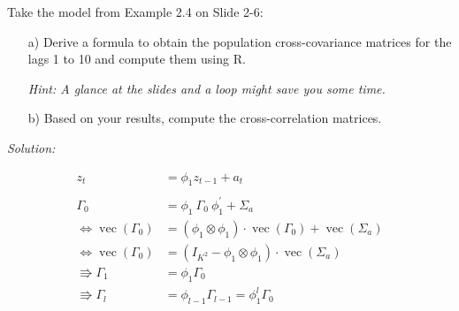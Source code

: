 \documentclass[12pt,a4paper]{article}
\renewcommand{\vec}{\operatorname{vec}}
\begin{document}
Take the model from Example 2.4 on Slide 2-6:

\begin{itemize}
  \item[a)] Derive a formula to obtain the population cross-covariance matrices for the lags 1 to 10 and compute them using R.
  \item[] \textit{Hint: A glance at the slides and a loop might save you some time.}
  \item[b)] Based on your results, compute the cross-correlation matrices.
\end{itemize}

\emph{Solution:}

\begin{align*}
  z_t & = \phi_1 z_{t-1} + a_t\\
  \\
  \Gamma_0 & = \phi_1  \ \Gamma_0 \ \phi_1^{'} + \Sigma_a\\
  \Leftrightarrow \vec(\Gamma_0) &= (\phi_1 \otimes \phi_1) \cdot \vec(\Gamma_0) + \vec(\Sigma_a) \\
  \Leftrightarrow \vec(\Gamma_0) &= (I_{K^2} - \phi_1 \otimes \phi_1) \cdot \vec(\Sigma_a) \\
 \Rrightarrow \Gamma_1 & = \phi_1 \Gamma_0\\
 \Rrightarrow \Gamma_l & = \phi_{l-1} \Gamma_{l-1} = \phi_1^{l} \Gamma_0\\
\end{align*}
\end{document}

